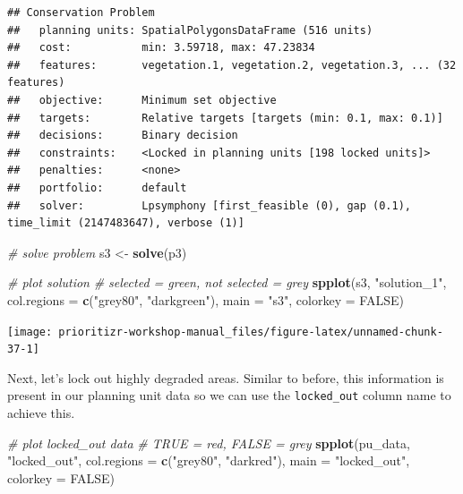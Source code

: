 \documentclass[
  12pt,
]{book}
\newenvironment{Shaded}{\begin{snugshade}}{\end{snugshade}}
\newcommand{\CommentTok}[1]{\textcolor[rgb]{0.56,0.35,0.01}{\textit{#1}}}
\newcommand{\DataTypeTok}[1]{\textcolor[rgb]{0.13,0.29,0.53}{#1}}
\newcommand{\KeywordTok}[1]{\textcolor[rgb]{0.13,0.29,0.53}{\textbf{#1}}}
\newcommand{\NormalTok}[1]{#1}
\newcommand{\OtherTok}[1]{\textcolor[rgb]{0.56,0.35,0.01}{#1}}
\newcommand{\StringTok}[1]{\textcolor[rgb]{0.31,0.60,0.02}{#1}}
\begin{document}
\begin{verbatim}
## Conservation Problem
##   planning units: SpatialPolygonsDataFrame (516 units)
##   cost:           min: 3.59718, max: 47.23834
##   features:       vegetation.1, vegetation.2, vegetation.3, ... (32 features)
##   objective:      Minimum set objective 
##   targets:        Relative targets [targets (min: 0.1, max: 0.1)]
##   decisions:      Binary decision 
##   constraints:    <Locked in planning units [198 locked units]>
##   penalties:      <none>
##   portfolio:      default
##   solver:         Lpsymphony [first_feasible (0), gap (0.1), time_limit (2147483647), verbose (1)]
\end{verbatim}

\begin{Shaded}
\begin{Highlighting}[]
\CommentTok{# solve problem}
\NormalTok{s3 <-}\StringTok{ }\KeywordTok{solve}\NormalTok{(p3)}

\CommentTok{# plot solution}
\CommentTok{# selected = green, not selected = grey}
\KeywordTok{spplot}\NormalTok{(s3, }\StringTok{"solution_1"}\NormalTok{, }\DataTypeTok{col.regions =} \KeywordTok{c}\NormalTok{(}\StringTok{"grey80"}\NormalTok{, }\StringTok{"darkgreen"}\NormalTok{), }\DataTypeTok{main =} \StringTok{"s3"}\NormalTok{,}
       \DataTypeTok{colorkey =} \OtherTok{FALSE}\NormalTok{)}
\end{Highlighting}
\end{Shaded}

\begin{center}\texttt{[image: prioritizr-workshop-manual\_files/figure-latex/unnamed-chunk-37-1]} \end{center}

Next, let's lock out highly degraded areas. Similar to before, this information is present in our planning unit data so we can use the \texttt{locked\_out} column name to achieve this.

\begin{Shaded}
\begin{Highlighting}[]
\CommentTok{# plot locked_out data}
\CommentTok{# TRUE = red, FALSE = grey}
\KeywordTok{spplot}\NormalTok{(pu_data, }\StringTok{"locked_out"}\NormalTok{, }\DataTypeTok{col.regions =} \KeywordTok{c}\NormalTok{(}\StringTok{"grey80"}\NormalTok{, }\StringTok{"darkred"}\NormalTok{),}
       \DataTypeTok{main =} \StringTok{"locked_out"}\NormalTok{, }\DataTypeTok{colorkey =} \OtherTok{FALSE}\NormalTok{)}
\end{Highlighting}
\end{Shaded}
\end{document}
